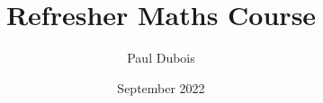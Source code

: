 \documentclass[11pt,a4paper]{report}
\title{Refresher Maths Course}
\author{Paul Dubois}
\date{September 2022}
\begin{document}
    \maketitle
    \begin{abstract}
    \end{abstract}
\end{document}
